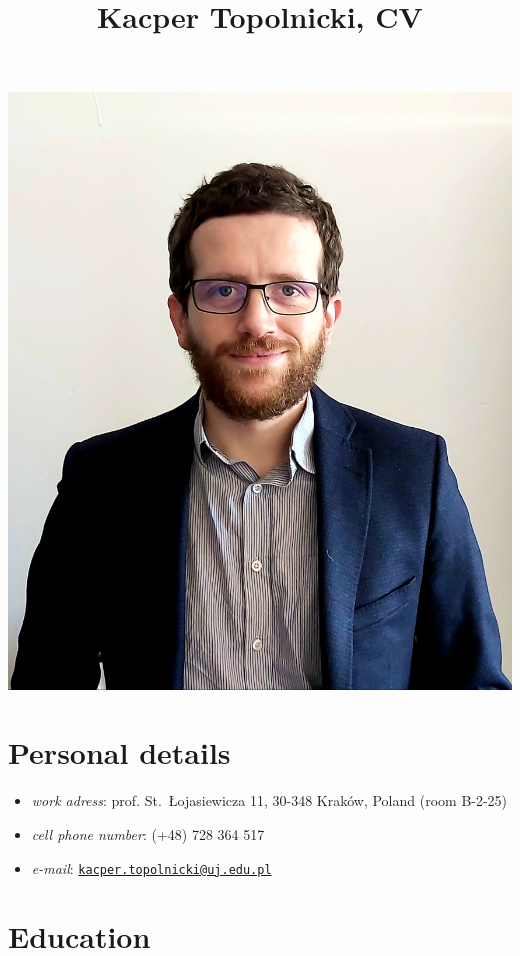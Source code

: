 \documentclass{article}
\providecommand{\tightlist}{%
  \setlength{\itemsep}{0pt}\setlength{\parskip}{0pt}}
\begin{document}
\title{Kacper Topolnicki, CV}
\maketitle

\begin{center}
	\includegraphics[width = 0.4 \textwidth]{./start/pic.jpg}
\end{center}

\hypertarget{personal-details}{%
\section*{Personal details}\label{personal-details}}

\begin{itemize}
\tightlist
\item
  \emph{work adress}: prof. St.~Łojasiewicza 11, 30-348 Kraków, Poland
  (room B-2-25)
\item
  \emph{cell phone number}: (+48) 728 364 517
\item
  \emph{e-mail}:
  \href{mailto:kacper.topolnicki@uj.edu.pl}{\nolinkurl{kacper.topolnicki@uj.edu.pl}}
\end{itemize}

\hypertarget{education}{%
\section*{Education}\label{education}}
\end{document}
